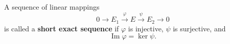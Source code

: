 A sequence of linear mappings
$$0 \longrightarrow E_1 \xrightarrow{\varphi} E \xrightarrow{\psi} E_2 \longrightarrow 0$$
is called a \textbf{short exact sequence} if $\varphi$ is injective, $\psi$ is surjective, and
$$\operatorname{Im} \varphi = \ker \psi.$$
